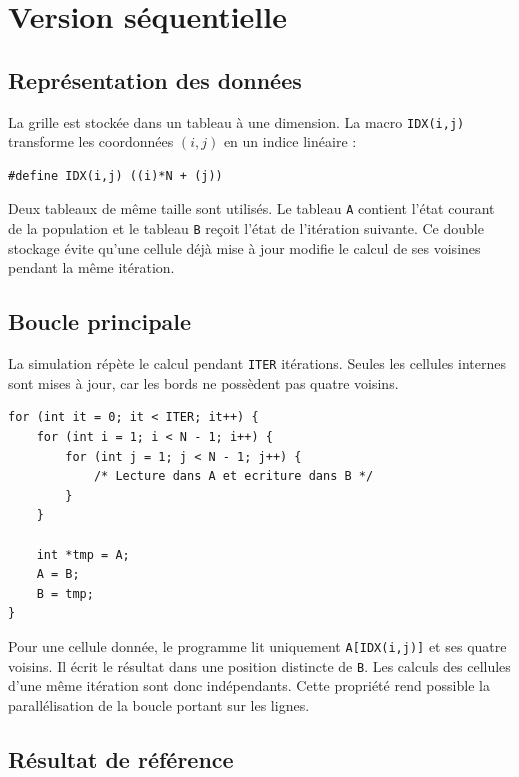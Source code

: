 \documentclass[a4paper,12pt]{article}
\begin{document}
\section{Version séquentielle}

\subsection{Représentation des données}

La grille est stockée dans un tableau à une dimension. La macro
\texttt{IDX(i,j)} transforme les coordonnées $(i,j)$ en un indice linéaire :

\begin{lstlisting}
#define IDX(i,j) ((i)*N + (j))
\end{lstlisting}

Deux tableaux de même taille sont utilisés. Le tableau \texttt{A} contient
l'état courant de la population et le tableau \texttt{B} reçoit l'état de
l'itération suivante. Ce double stockage évite qu'une cellule déjà mise à jour
modifie le calcul de ses voisines pendant la même itération.

\subsection{Boucle principale}

La simulation répète le calcul pendant \texttt{ITER} itérations. Seules les
cellules internes sont mises à jour, car les bords ne possèdent pas quatre
voisins.

\begin{lstlisting}
for (int it = 0; it < ITER; it++) {
    for (int i = 1; i < N - 1; i++) {
        for (int j = 1; j < N - 1; j++) {
            /* Lecture dans A et ecriture dans B */
        }
    }

    int *tmp = A;
    A = B;
    B = tmp;
}
\end{lstlisting}

Pour une cellule donnée, le programme lit uniquement \texttt{A[IDX(i,j)]} et
ses quatre voisins. Il écrit le résultat dans une position distincte de
\texttt{B}. Les calculs des cellules d'une même itération sont donc
indépendants. Cette propriété rend possible la parallélisation de la boucle
portant sur les lignes.

\subsection{Résultat de référence}
\end{document}
